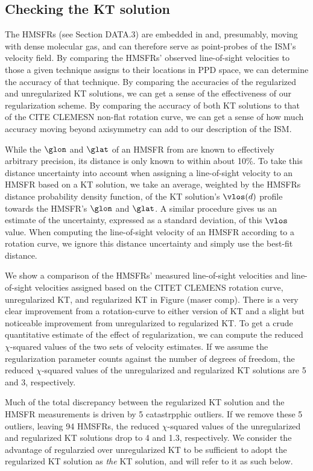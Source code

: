 \subsection{Checking the KT solution}
\label{sec:KT-validation}

The \Reid{} HMSFRs (see Section DATA.3) are embedded in and, presumably, moving with dense molecular gas, and can therefore serve as point-probes of the ISM's velocity field. 
By comparing the HMSFRs' observed line-of-sight velocities to those a given technique assigns to their locations in PPD space, we can determine the accuracy of that technique. 
By comparing the accuracies of the regularized and unregularized KT solutions, we can get a sense of the effectiveness of our regularization scheme. 
By comparing the accuracy of both KT solutions to that of the CITE CLEMESN non-flat rotation curve, we can get a sense of how much accuracy moving beyond axisymmetry can add to our description of the ISM. 

While the $\glon$ and $\glat$ of an HMSFR from \Reid{} are known to effectively arbitrary precision, its distance is only known to within about 10\%. 
To take this distance uncertainty into account when assigning a line-of-sight velocity to an HMSFR based on a KT solution, we take an average, weighted by the HMSFRs distance probability density function, of the KT solution's $\vlos(d)$ profile towards the HMSFR's $\glon$ and $\glat$. 
A similar procedure gives us an estimate of the uncertainty, expressed as a standard deviation, of this $\vlos$ value. 
When computing the line-of-sight velocity of an HMSFR according to a rotation curve, we ignore this distance uncertainty and simply use the best-fit distance. 

We show a comparison of the HMSFRs' measured line-of-sight velocities and line-of-sight velocities assigned based on the CITET CLEMENS rotation curve, unregularized KT, and regularized KT in Figure (maser comp). 
There is a very clear improvement from a rotation-curve to either version of KT and a slight but noticeable improvement from unregularized to regularized KT. 
To get a crude quantitative estimate of the effect of regularization, we can compute the reduced $\chi$-squared values of the two sets of velocity estimates. 
If we assume the regularization parameter counts against the number of degrees of freedom, the reduced $\chi$-squared values of the unregularized and regularized KT solutions are 5 and 3, respectively. 

Much of the total discrepancy between the regularized KT solution and the HMSFR measurements is driven by 5 catastrpphic outliers. 
If we remove these 5 outliers, leaving 94 HMSFRs, the reduced $\chi$-squared values of the unregularized and regularized KT solutions drop to 4 and 1.3, respectively. 
We consider the advantage of regularzied over unregularized KT to be sufficient to adopt the regularized KT solution as \emph{the} KT solution, and will refer to it as such below.


